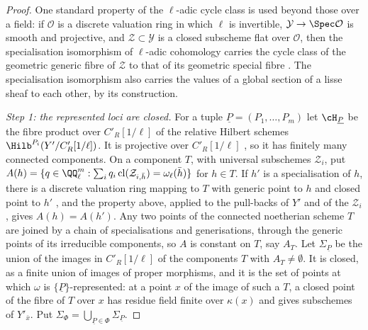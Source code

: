 \begin{proof}
One standard property of the $\ell$-adic cycle class is used beyond those over
a field: if $\mathcal{O}$ is a discrete valuation ring in which $\ell$ is
invertible, $\mathcal{Y}\to\Spec\mathcal{O}$ is smooth and projective, and
$\mathcal{Z}\subset\mathcal{Y}$ is a closed subscheme flat over $\mathcal{O}$,
then the specialisation isomorphism of $\ell$-adic cohomology carries the
cycle class of the geometric generic fibre of $\mathcal{Z}$ to that of its
geometric special fibre \cite[Cycle]{SGA4h}. The specialisation isomorphism
also carries the values of a global section of a lisse sheaf to each other,
by its construction.

\emph{Step 1: the represented loci are closed.} For a tuple
$\underline{P}=(P_{1},\dots,P_{m})$ let $\cH_{\underline{P}}$ be the fibre
product over $C'_{R}[1/\ell]$ of the relative Hilbert schemes
$\Hilb^{P_{i}}(Y'/C'_{R}[1/\ell])$. It is projective over $C'_{R}[1/\ell]$
\cite{Gro61}, so it has finitely many connected components. On a component
$T$, with universal subschemes $\mathcal{Z}_{i}$, put $A(h)=\{q\in
\QQ_{\ell}^{m}:\sum_{i}q_{i}\operatorname{cl}(\mathcal{Z}_{i,\bar{h}})
=\omega_{\ell}(\bar{h})\}$ for $h\in T$. If $h'$ is a specialisation of $h$,
there is a discrete valuation ring mapping to $T$ with generic point to $h$ and
closed point to $h'$ \cite[Tag~054F]{Stacks}, and the property above, applied
to the pull-backs of $Y'$ and of the $\mathcal{Z}_{i}$, gives $A(h)=A(h')$.
Any two points of the connected noetherian scheme $T$ are joined by a chain of
specialisations and generisations, through the generic points of its
irreducible components, so $A$ is constant on $T$, say $A_{T}$. Let
$\Sigma_{\underline{P}}$ be the union of the images in $C'_{R}[1/\ell]$ of the
components $T$ with $A_{T}\ne\emptyset$. It is closed, as a finite union of
images of proper morphisms, and it is the set of points at which $\omega$ is
$\{\underline{P}\}$-represented: at a point $x$ of the image of such a $T$, a
closed point of the fibre of $T$ over $x$ has residue field finite over
$\kappa(x)$ and gives subschemes of $Y'_{\bar{x}}$. Put
$\Sigma_{\Phi}=\bigcup_{\underline{P}\in\Phi}\Sigma_{\underline{P}}$.


\end{proof}
